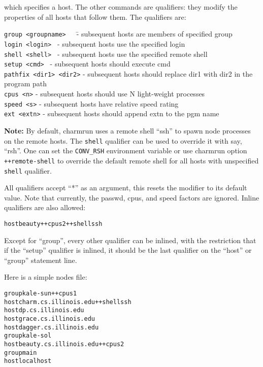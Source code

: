 which specifies a host.  The other commands are qualifiers: they modify
the properties of all hosts that follow them.  The qualifiers are:


\begin{tabbing}
{\tt group <groupname>}~~~\= - subsequent hosts are members of specified group\\
{\tt login <login>  }     \> - subsequent hosts use the specified login\\
{\tt shell <shell>  }     \> - subsequent hosts use the specified remote
shell\\
{\tt setup <cmd>  }       \> - subsequent hosts should execute cmd\\
{\tt pathfix <dir1> <dir2>}         \> - subsequent hosts should replace dir1 with dir2 in the program path\\
{\tt cpus <n>}            \> - subsequent hosts should use N light-weight processes\\
{\tt speed <s>}           \> - subsequent hosts have relative speed rating\\
{\tt ext <extn>}          \> - subsequent hosts should append extn to the pgm name\\
\end{tabbing}

{\bf Note:}
By default, charmrun uses a remote shell ``ssh'' to spawn node processes
on the remote hosts. The {\tt shell} qualifier can be used to override
it with say, ``rsh''. One can set the {\tt CONV\_RSH} environment variable
or use charmrun option {\tt ++remote-shell} to override the default remote
shell for all hosts with unspecified {\tt shell} qualifier.

All qualifiers accept ``*'' as an argument, this resets the modifier to
its default value.  Note that currently, the passwd, cpus, and speed
factors are ignored.  Inline qualifiers are also allowed:

\begin{alltt}
host beauty ++cpus 2 ++shell ssh
\end{alltt}

Except for ``group'', every other qualifier can be inlined, with the
restriction that if the ``setup'' qualifier is inlined, it should be
the last qualifier on the ``host'' or ``group'' statement line.

Here is a simple nodes file:

\begin{alltt}
        group kale-sun ++cpus 1
          host charm.cs.illinois.edu ++shell ssh
          host dp.cs.illinois.edu
          host grace.cs.illinois.edu
          host dagger.cs.illinois.edu
        group kale-sol
          host beauty.cs.illinois.edu ++cpus 2
        group main
          host localhost
\end{alltt}

